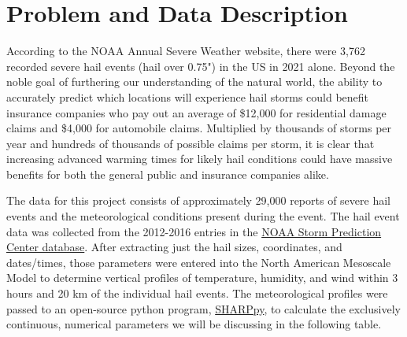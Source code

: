 \documentclass[fleqn,10pt]{SelfArx} %
\affiliation{\textsuperscript{1}\textit{Computer Science, School of Informatics , Computing and Engineering, Indiana University, Bloomington, IN, USA}} %
\begin{document}
\flushbottom %

\maketitle %

\tableofcontents %

\thispagestyle{empty} %






\section{Problem and Data Description} %

\:According to the NOAA Annual Severe Weather website, there were 3,762 recorded severe hail events (hail over 0.75") in the US in 2021 alone. Beyond the noble goal of furthering our understanding of the natural world, the ability to accurately predict which locations will experience hail storms could benefit insurance companies who pay out an average of \$12,000 for residential damage claims and \$4,000 for automobile claims. Multiplied by thousands of storms per year and hundreds of thousands of possible claims per storm, it is clear that increasing advanced warming times for likely hail conditions could have massive benefits for both the general public and insurance companies alike.

The data for this project consists of approximately 29,000 reports of severe hail events and the meteorological conditions present during the event. The hail event data was collected from the 2012-2016 entries in the \href{https://www.spc.noaa.gov/wcm/#data}{NOAA Storm Prediction Center database}. After extracting just the hail sizes, coordinates, and dates/times, those parameters were entered into the North American Mesoscale Model to determine vertical profiles of temperature, humidity, and wind within 3 hours and 20 km of the individual hail events. The meteorological profiles were passed to an open-source python program, \href{https://github.com/sharppy/SHARPpy}{SHARPpy}, to calculate the exclusively continuous, numerical parameters we will be discussing in the following table.
\end{document}
